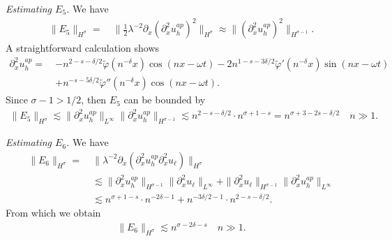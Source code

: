 \documentclass[reqno]{amsart}
\theoremstyle{plain}
\numberwithin{equation}{section}
\begin{document}
 
 {\em Estimating $E_5$.}
 We have 
    \begin{align*}
 \| E_5 \|_{H^\sigma}  
 = \ &  \|   \frac12 \lambda^{-2} \partial_x ( \partial_x ^2 u_h^{ap} )^2     \|_{H^\sigma} 
   \approx 
   \|    ( \partial_x ^2 u_h^{ap} )^2     \|_{H^{\sigma-1} } .
 \end{align*}
 A straightforward calculation shows
    \begin{align*}
  \partial_x ^2 u_h^{ap} = \ & -n^{2-s-\delta/2} \widetilde \varphi (n^{-\delta} x) \cos(nx-\omega t) -2 n^{1-s-3\delta/2}  \widetilde \varphi '(n^{-\delta} x) \sin(nx-\omega t)
  \\
  & +n^{-s-5\delta/2}\widetilde \varphi ''(n^{-\delta} x)\cos(nx-\omega t)
  .
 \end{align*}
Since $\sigma -1 >  1/2$, then $E_5$ can be bounded by 
     \begin{align*}
 \| E_5 \|_{H^\sigma}   \lesssim 
   \|    \partial_x ^2 u_h^{ap}       \|_{ L^\infty  }   \|    \partial_x ^2 u_h^{ap}       \|_{  H^{\sigma-1} }   \lesssim n^{2-s-\delta/2} \cdot n^{\sigma + 1-s }   = n^{\sigma + 3-2s-\delta/2}  \quad n \gg 1 .
 \end{align*}
 
 
 
 
 {\em Estimating $E_6$.}
  We have 
    \begin{align*}
 \| E_6 \|_{H^\sigma}  
 = \ &  \|   \lambda^{-2} \partial_x ( \partial_x ^2 u_h^{ap} \partial_x ^2 u_\ell )     \|_{H^\sigma} 
 \\ & \lesssim
   \|   \partial_x ^2 u_h^{ap}     \|_{H^{\sigma-1} }    \|    \partial_x ^2 u_\ell     \|_{ L^\infty}  +   \|   \partial_x ^2 u_\ell        \|_{H^{\sigma-1} }    \|    \partial_x ^2 u_h^{ap}     \|_{ L^\infty}  
    \\ & \lesssim
 n^{ \sigma+ 1 -s}  \cdot   n^{-2\delta -1} +   n^{-3\delta/2-1} \cdot n^{2-s-\delta/2} .
 \end{align*}
 From which we obtain 
     \begin{align*}
 \| E_6 \|_{H^\sigma}   \lesssim n^{\sigma-2\delta -s }  \quad n \gg 1  .
  \end{align*}
 
\end{document}
